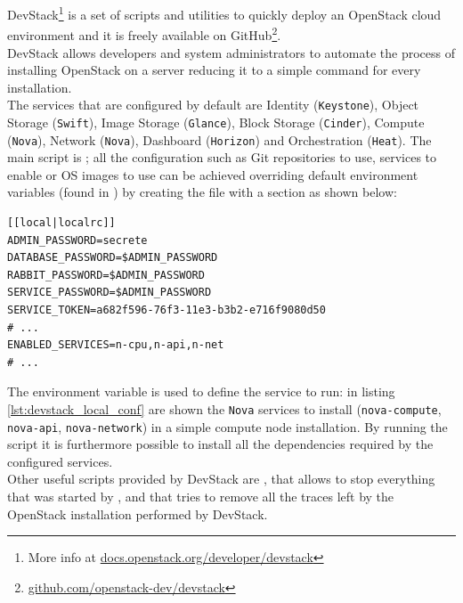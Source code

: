 DevStack\footnote{More info at \url{docs.openstack.org/developer/devstack}} is a set of scripts and utilities to quickly deploy an OpenStack cloud environment and it is freely available on GitHub\footnote{\url{github.com/openstack-dev/devstack}}.\\
DevStack allows developers and system administrators to automate the process of installing OpenStack on a server reducing it to a simple command for every installation.\\
The services that are configured by default are Identity (\texttt{Keystone}), Object Storage (\texttt{Swift}), Image Storage (\texttt{Glance}), Block Storage (\texttt{Cinder}), Compute (\texttt{Nova}), Network (\texttt{Nova}), Dashboard (\texttt{Horizon}) and Orchestration (\texttt{Heat}).
The main script is ; all the configuration such as Git repositories to use, services to enable or OS images to use can be achieved overriding default environment variables (found in ) by creating the file  with a  section as shown below:
\begin{lstlisting}[numbers=none,label={lst:devstack_local_conf}]
[[local|localrc]]
ADMIN_PASSWORD=secrete
DATABASE_PASSWORD=$ADMIN_PASSWORD
RABBIT_PASSWORD=$ADMIN_PASSWORD
SERVICE_PASSWORD=$ADMIN_PASSWORD
SERVICE_TOKEN=a682f596-76f3-11e3-b3b2-e716f9080d50
# ...
ENABLED_SERVICES=n-cpu,n-api,n-net
# ...
\end{lstlisting}
The environment variable  is used to define the service to run: in listing \ref{lst:devstack_local_conf} are shown the \texttt{Nova} services to install (\texttt{nova-compute}, \texttt{nova-api}, \texttt{nova-network}) in a simple compute node installation.
By running the script  it is furthermore possible to install all the dependencies required by the configured services.\\Other useful scripts provided by DevStack are , that allows to stop everything that was started by , and  that tries to remove all the traces left by the OpenStack installation performed by DevStack.
